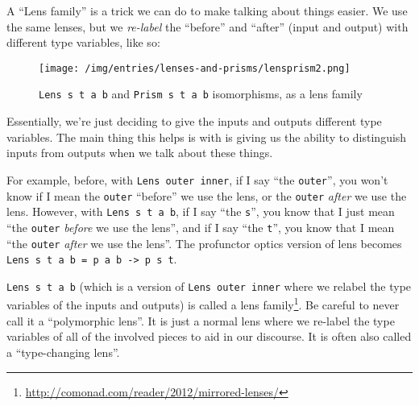 \documentclass[]{article}
\renewcommand{\href}[2]{#2\footnote{\url{#1}}}
\begin{document}
A ``Lens family'' is a trick we can do to make talking about things easier. We
use the same lenses, but we \emph{re-label} the ``before'' and ``after'' (input
and output) with different type variables, like so:

\begin{figure}
\centering
\texttt{[image: /img/entries/lenses-and-prisms/lensprism2.png]}
\caption{\texttt{Lens\ s\ t\ a\ b} and \texttt{Prism\ s\ t\ a\ b} isomorphisms,
as a lens family}
\end{figure}

Essentially, we're just deciding to give the inputs and outputs different type
variables. The main thing this helps is with is giving us the ability to
distinguish inputs from outputs when we talk about these things.

For example, before, with \texttt{Lens\textquotesingle{}\ outer\ inner}, if I
say ``the \texttt{outer}'', you won't know if I mean the \texttt{outer}
``before'' we use the lens, or the \texttt{outer} \emph{after} we use the lens.
However, with \texttt{Lens\ s\ t\ a\ b}, if I say ``the \texttt{s}'', you know
that I just mean ``the \texttt{outer} \emph{before} we use the lens'', and if I
say ``the \texttt{t}'', you know that I mean ``the \texttt{outer} \emph{after}
we use the lens''. The profunctor optics version of lens becomes
\texttt{Lens\ s\ t\ a\ b\ =\ p\ a\ b\ -\textgreater{}\ p\ s\ t}.

\texttt{Lens\ s\ t\ a\ b} (which is a version of
\texttt{Lens\textquotesingle{}\ outer\ inner} where we relabel the type
variables of the inputs and outputs) is called a
\href{http://comonad.com/reader/2012/mirrored-lenses/}{lens family}. Be careful
to never call it a ``polymorphic lens''. It is just a normal lens where we
re-label the type variables of all of the involved pieces to aid in our
discourse. It is often also called a ``type-changing lens''.
\end{document}
